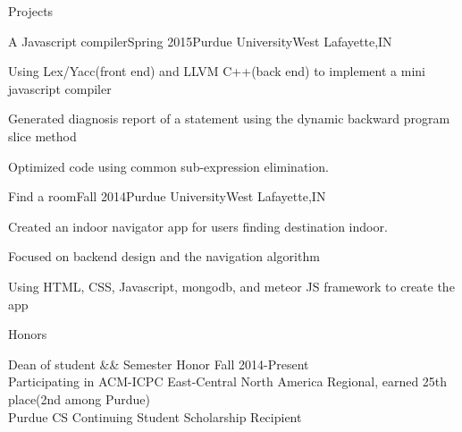 \documentclass{resume} %
\begin{document}
\begin{rSection}{Projects}

\begin{rSubsection}{A Javascript compiler}{Spring 2015}{Purdue University}{West Lafayette,IN}
\item Using Lex/Yacc(front end) and LLVM C++(back end) to implement a mini javascript compiler
\item Generated diagnosis report of a statement using the dynamic backward program slice method  
\item Optimized code using common sub-expression elimination.
\end{rSubsection}


\begin{rSubsection}{Find a room}{Fall 2014}{Purdue University}{West Lafayette,IN}
\item Created an indoor navigator app for users finding destination indoor.
\item Focused on backend design and the navigation algorithm
\item Using HTML, CSS, Javascript, mongodb, and meteor JS framework to create the app
\end{rSubsection}






\end{rSection}

\begin{rSection}{Honors}{}{}


Dean of student \&\& Semester Honor  \hspace{90mm} Fall  2014-Present\\ 
Participating in ACM-ICPC East-Central North America Regional, earned 25th place(2nd among Purdue)  \\
Purdue CS Continuing Student Scholarship Recipient \\




\end{rSection}

\end{document}
